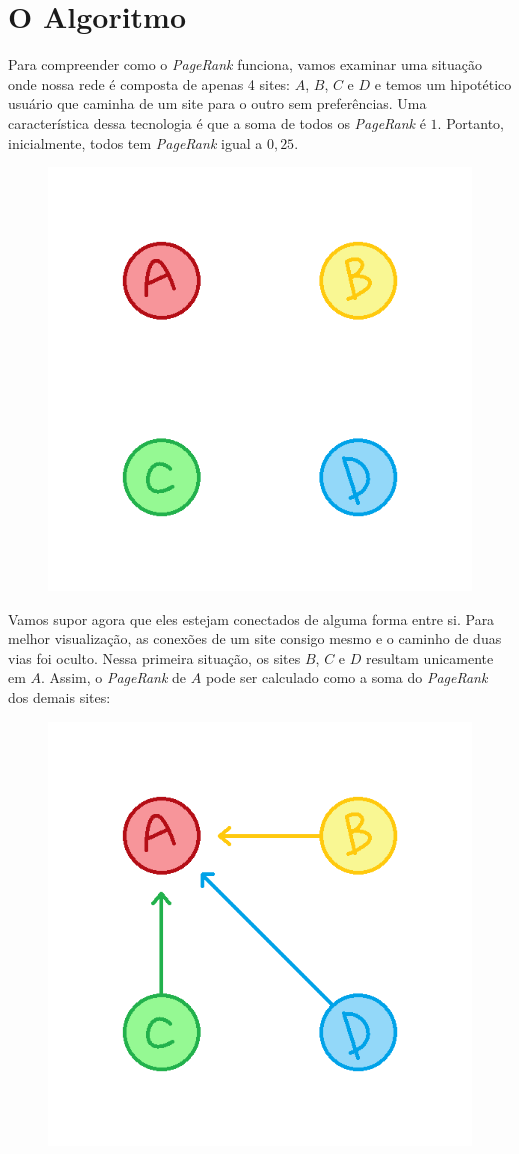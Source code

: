 \documentclass[11pt]{article}
\begin{document}
\newpage

    \hypertarget{o-algoritmo}{%
\section{O Algoritmo}\label{o-algoritmo}}

Para compreender como o \emph{PageRank} funciona, vamos examinar uma
situação onde nossa rede é composta de apenas 4 sites: \(A\), \(B\),
\(C\) e \(D\) e temos um hipotético usuário que caminha de um site para
o outro sem preferências. Uma característica dessa tecnologia é que a
soma de todos os \emph{PageRank} é \(1\). Portanto, inicialmente, todos
tem \emph{PageRank} igual a \(0,25\).

\begin{figure}
\centering
\includegraphics[width = .4\textwidth]{../img/ABCD1.png}
\end{figure}


    Vamos supor agora que eles estejam conectados de alguma forma entre si.
Para melhor visualização, as conexões de um site consigo mesmo e o
caminho de duas vias foi oculto. Nessa primeira situação, os sites
\(B\), \(C\) e \(D\) resultam unicamente em \(A\). Assim, o
\emph{PageRank} de \(A\) pode ser calculado como a soma do
\emph{PageRank} dos demais sites:

\begin{figure}
\centering
\includegraphics[width = .4\textwidth]{../img/ABCD2.png}
\end{figure}
\end{document}
